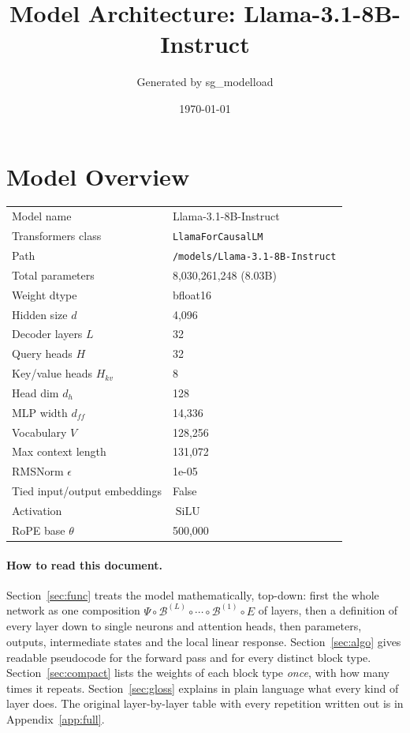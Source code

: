 \documentclass[10pt,a4paper]{article}
\title{Model Architecture: Llama-3.1-8B-Instruct}
\author{Generated by sg\_modelload}
\date{\today}
\newcommand{\op}[1]{\operatorname{#1}}
\theoremstyle{definition}
\begin{document}
\maketitle
\tableofcontents
\clearpage
\section{Model Overview}
\begin{tabular}{ll}
\toprule
Model name & Llama-3.1-8B-Instruct \\
Transformers class & \texttt{LlamaForCausalLM} \\
Path & \texttt{/models/Llama-3.\allowbreak{}1-8B-Instruct} \\
Total parameters & 8,030,261,248 (8.03B) \\
Weight dtype & bfloat16 \\
\midrule
Hidden size $d$ & 4,096 \\
Decoder layers $L$ & 32 \\
Query heads $H$ & 32 \\
Key/value heads $H_{kv}$ & 8 \\
Head dim $d_h$ & 128 \\
MLP width $d_{ff}$ & 14,336 \\
Vocabulary $V$ & 128,256 \\
Max context length & 131,072 \\
RMSNorm $\epsilon$ & 1e-05 \\
Tied input/output embeddings & False \\
Activation & $\op{SiLU}$ \\
RoPE base $\theta$ & 500,000 \\
\bottomrule
\end{tabular}

\paragraph{How to read this document.} Section~\ref{sec:func} treats the model mathematically, top-down: first the whole network as one composition $\Psi\circ\mathcal{B}^{(L)}\circ\cdots\circ\mathcal{B}^{(1)}\circ E$ of layers, then a definition of every layer down to single neurons and attention heads, then parameters, outputs, intermediate states and the local linear response. Section~\ref{sec:algo} gives readable pseudocode for the forward pass and for every distinct block type. Section~\ref{sec:compact} lists the weights of each block type \emph{once}, with how many times it repeats. Section~\ref{sec:gloss} explains in plain language what every kind of layer does. The original layer-by-layer table with every repetition written out is in Appendix~\ref{app:full}.
\end{document}
